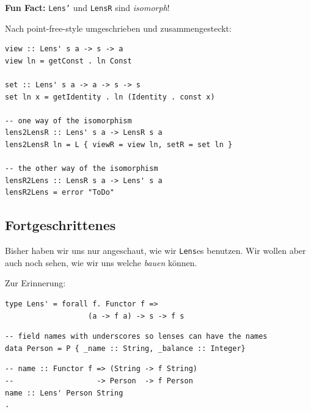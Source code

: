 \documentclass{beamer}
\begin{document}
\begin{frame}[fragile]

\textbf{Fun Fact:} \texttt{Lens'} und \texttt{LensR} sind \emph{isomorph}!
\smallskip\smallskip

Nach point-free-style umgeschrieben und zusammengesteckt:

\begin{verbatim}
view :: Lens' s a -> s -> a
view ln = getConst . ln Const

set :: Lens' s a -> a -> s -> s
set ln x = getIdentity . ln (Identity . const x)

-- one way of the isomorphism
lens2LensR :: Lens' s a -> LensR s a
lens2LensR ln = L { viewR = view ln, setR = set ln }

-- the other way of the isomorphism
lensR2Lens :: LensR s a -> Lens' s a
lensR2Lens = error "ToDo"
\end{verbatim}
 
\end{frame}

\subsection{Fortgeschrittenes}

\begin{frame}[fragile]

Bisher haben wir uns nur angeschaut, wie wir \texttt{Lens}es benutzen. Wir wollen aber auch noch sehen, wie wir uns welche \emph{bauen} können.
\pause
\smallskip
\smallskip

Zur Erinnerung:
\begin{verbatim}
type Lens' = forall f. Functor f =>
                   (a -> f a) -> s -> f s
\end{verbatim}
\pause
\smallskip

\begin{verbatim}
-- field names with underscores so lenses can have the names
data Person = P { _name :: String, _balance :: Integer}
\end{verbatim}
\pause
\bigskip

\begin{verbatim}
-- name :: Functor f => (String -> f String)
--                   -> Person  -> f Person
name :: Lens' Person String
.
\end{verbatim}

\end{frame}
\end{document}
